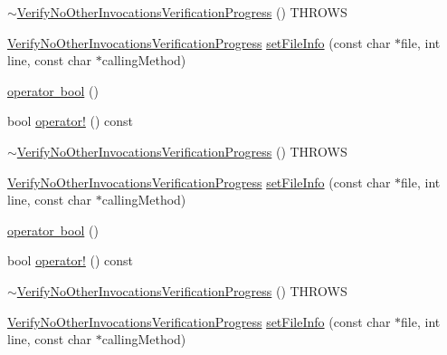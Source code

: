 \begin{DoxyCompactItemize}
\item 
\mbox{\hyperlink{classfakeit_1_1VerifyNoOtherInvocationsVerificationProgress_a772030e95159eefd02781fb3ea7724cd}{$\sim$\+Verify\+No\+Other\+Invocations\+Verification\+Progress}} () T\+H\+R\+O\+WS
\item 
\mbox{\hyperlink{classfakeit_1_1VerifyNoOtherInvocationsVerificationProgress}{Verify\+No\+Other\+Invocations\+Verification\+Progress}} \mbox{\hyperlink{classfakeit_1_1VerifyNoOtherInvocationsVerificationProgress_a7f7eed982a12383ca4254831cf4d223b}{set\+File\+Info}} (const char $\ast$file, int line, const char $\ast$calling\+Method)
\item 
\mbox{\hyperlink{classfakeit_1_1VerifyNoOtherInvocationsVerificationProgress_a0c43a3d8783d9dae9d963190a6a41b47}{operator bool}} ()
\item 
bool \mbox{\hyperlink{classfakeit_1_1VerifyNoOtherInvocationsVerificationProgress_a61e25bc85da74b9eceae47fcca1dec4f}{operator!}} () const
\item 
\mbox{\hyperlink{classfakeit_1_1VerifyNoOtherInvocationsVerificationProgress_a772030e95159eefd02781fb3ea7724cd}{$\sim$\+Verify\+No\+Other\+Invocations\+Verification\+Progress}} () T\+H\+R\+O\+WS
\item 
\mbox{\hyperlink{classfakeit_1_1VerifyNoOtherInvocationsVerificationProgress}{Verify\+No\+Other\+Invocations\+Verification\+Progress}} \mbox{\hyperlink{classfakeit_1_1VerifyNoOtherInvocationsVerificationProgress_a7f7eed982a12383ca4254831cf4d223b}{set\+File\+Info}} (const char $\ast$file, int line, const char $\ast$calling\+Method)
\item 
\mbox{\hyperlink{classfakeit_1_1VerifyNoOtherInvocationsVerificationProgress_a0c43a3d8783d9dae9d963190a6a41b47}{operator bool}} ()
\item 
bool \mbox{\hyperlink{classfakeit_1_1VerifyNoOtherInvocationsVerificationProgress_a61e25bc85da74b9eceae47fcca1dec4f}{operator!}} () const
\item 
\mbox{\hyperlink{classfakeit_1_1VerifyNoOtherInvocationsVerificationProgress_a772030e95159eefd02781fb3ea7724cd}{$\sim$\+Verify\+No\+Other\+Invocations\+Verification\+Progress}} () T\+H\+R\+O\+WS
\item 
\mbox{\hyperlink{classfakeit_1_1VerifyNoOtherInvocationsVerificationProgress}{Verify\+No\+Other\+Invocations\+Verification\+Progress}} \mbox{\hyperlink{classfakeit_1_1VerifyNoOtherInvocationsVerificationProgress_a7f7eed982a12383ca4254831cf4d223b}{set\+File\+Info}} (const char $\ast$file, int line, const char $\ast$calling\+Method)

\end{DoxyCompactItemize}
